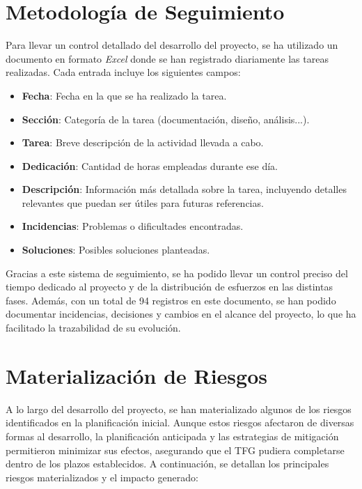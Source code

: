 \section{Metodología de Seguimiento}

Para llevar un control detallado del desarrollo del proyecto, se ha utilizado un documento en formato \textit{Excel} donde se han registrado diariamente las tareas realizadas. Cada entrada incluye los siguientes campos:

\begin{itemize}\setlength{\itemsep}{0pt}
    \item \textbf{Fecha}: Fecha en la que se ha realizado la tarea.
    \item \textbf{Sección}: Categoría de la tarea (documentación, diseño, análisis...).
    \item \textbf{Tarea}: Breve descripción de la actividad llevada a cabo.
    \item \textbf{Dedicación}: Cantidad de horas empleadas durante ese día.
    \item \textbf{Descripción}: Información más detallada sobre la tarea, incluyendo detalles relevantes que puedan ser útiles para futuras referencias.
    \item \textbf{Incidencias}: Problemas o dificultades encontradas.
    \item \textbf{Soluciones}: Posibles soluciones planteadas.
\end{itemize}

Gracias a este sistema de seguimiento, se ha podido llevar un control preciso del tiempo dedicado al proyecto y de la distribución de esfuerzos en las distintas fases. Además, con un total de 94 registros en este documento, se han podido documentar incidencias, decisiones y cambios en el alcance del proyecto, lo que ha facilitado la trazabilidad de su evolución.


\section{Materialización de Riesgos} \label{sec:materializacion_riesgos}

A lo largo del desarrollo del proyecto, se han materializado algunos de los riesgos identificados en la planificación inicial. Aunque estos riesgos afectaron de diversas formas al desarrollo, la planificación anticipada y las estrategias de mitigación permitieron minimizar sus efectos, asegurando que el TFG pudiera completarse dentro de los plazos establecidos. A continuación, se detallan los principales riesgos materializados y el impacto generado:

